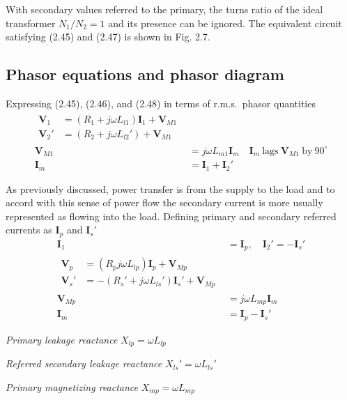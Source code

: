 \documentclass[a4paper,numbers=noenddot,12pt]{scrbook}
\begin{document}
With secondary values referred to the primary, the turns ratio of the ideal transformer $N_1/N_2 = 1$ and its presence can be ignored. The equivalent circuit satisfying (2.45) and (2.47) is shown in Fig. 2.7. 


\subsection{Phasor equations and phasor diagram}
Expressing (2.45), (2.46), and (2.48) in terms of r.m.s.\ phasor quantities
\begin{align}
    \begin{split}
        \mathbf{V}_1 & = (R_1 + j\omega L_{l1}) \mathbf{I}_1 + \mathbf{V}_{M1} \\
        \mathbf{V}_2' & = (R_2 + j\omega L_{l2}') + \mathbf{V}_{M1}
    \end{split}\\
    \mathbf{V}_{M1} & = j\omega L_{m1} \mathbf{I}_m \quad \mathbf{I}_m\ \text{lags}\ \mathbf{V}_{M1} \ \text{by} \ 90^\circ \\
    \mathbf{I}_m & = \mathbf{I}_1 + \mathbf{I}_2'
    \label{eq:Eq2.49}
\end{align}

As previously discussed, power transfer is from the supply to the load and to accord with this sense of power flow the secondary current is more usually represented as flowing into the load. Defining primary and secondary referred currents as $\mathbf{I}_p$ and $\mathbf{I}_s'$
\begin{align}
    \mathbf{I}_1 & = \mathbf{I}_p, \quad \mathbf{I}_2' = - \mathbf{I}_s' \nonumber \\
    \begin{split} 
        \mathbf{V}_p & = (R_p j \omega L_{lp}) \mathbf{I}_p + \mathbf{V}_{Mp} \\
        \mathbf{V}_s' & = -(R_s' + j \omega L_{ls}')\mathbf{I}_s' + \mathbf{V}_{Mp} 
    \end{split} \\
    \mathbf{V}_{Mp} & =j \omega L_{mp} \mathbf{I}_m \\
    \mathbf{I}_m &= \mathbf{I}_p - \mathbf{I}_s'
    \label{eq:Eq2.54}
\end{align}

\textit{Primary leakage reactance} $X_{lp} = \omega L_{lp}$ 

\textit{Referred secondary leakage reactance} $X_{ls}' = \omega L_{ls}'$ 

\textit{Primary magnetizing reactance} $X_{mp} = \omega L_{mp}$
\end{document}
